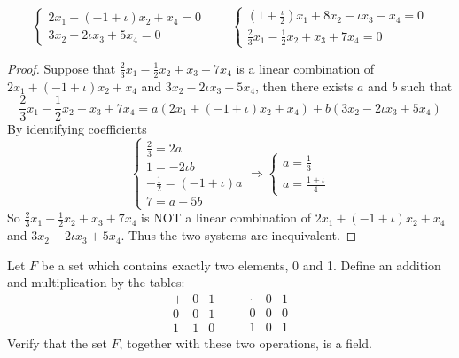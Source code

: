 \begin{exercise}
	\[
		\begin{cases}
			2x_{1} + (-1 + \iota)x_{2} + x_{4} = 0 \\
			3x_{2} - 2\iota x_{3} + 5x_{4} = 0
		\end{cases}
		\qquad
		\begin{cases}
			\left(1 + \frac{\iota}{2}\right)x_{1} + 8x_{2} - \iota x_{3} - x_{4} = 0 \\
			\frac{2}{3}x_{1} - \frac{1}{2}x_{2} + x_{3} + 7x_{4} = 0
		\end{cases}
	\]
\end{exercise}

\begin{proof}
	Suppose that $\frac{2}{3}x_{1} - \frac{1}{2}x_{2} + x_{3} + 7x_{4}$ is a linear combination of $2x_{1} + (-1 + \iota)x_{2} + x_{4}$ and $3x_{2} - 2\iota x_{3} + 5x_{4}$, then there exists $a$ and $b$ such that
	\[
		\frac{2}{3}x_{1} - \frac{1}{2}x_{2} + x_{3} + 7x_{4} = a(2x_{1} + (-1 + \iota)x_{2} + x_{4}) + b(3x_{2} - 2\iota x_{3} + 5x_{4})
	\]
	By identifying coefficients
	\[
		\begin{cases}
			\frac{2}{3} = 2a             \\
			1 = -2\iota b                \\
			-\frac{1}{2} = (-1 + \iota)a \\
			7 = a + 5b
		\end{cases}
		\Longrightarrow
		\begin{cases}
			a = \frac{1}{3} \\
			a = \frac{1 + \iota}{4}
		\end{cases}
	\]
	So $\frac{2}{3}x_{1} - \frac{1}{2}x_{2} + x_{3} + 7x_{4}$ is NOT a linear combination of $2x_{1} + (-1 + \iota)x_{2} + x_{4}$ and $3x_{2} - 2\iota x_{3} + 5x_{4}$. Thus the two systems are inequivalent.
\end{proof}

\begin{exercise}
	Let $F$ be a set which contains exactly two elements, 0 and 1. Define an addition and multiplication by the tables:
	\[
		\begin{array}{c|cc}
			+ & 0 & 1 \\
			\hline
			0 & 0 & 1 \\
			1 & 1 & 0
		\end{array}
		\qquad
		\begin{array}{c|cc}
			\cdot & 0 & 1 \\
			\hline
			0     & 0 & 0 \\
			1     & 0 & 1
		\end{array}
	\]
	Verify that the set $F$, together with these two operations, is a field.
\end{exercise}

